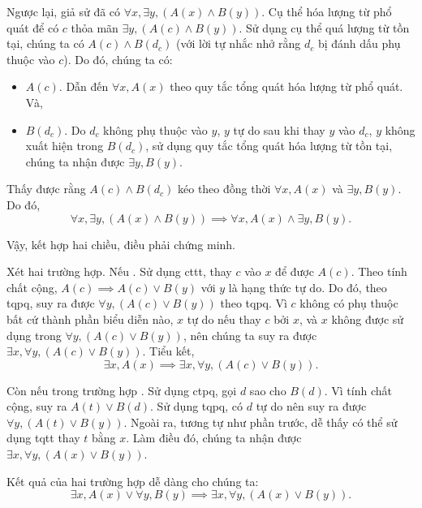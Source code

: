 Ngược lại, giả sử đã có $\forall x, \exists y, (A(x) \land B(y))$. Cụ thể hóa lượng từ phổ quát để có $c$ thỏa mãn $\exists y, (A(c) \land B(y))$. Sử dụng cụ thể quá lượng từ tồn tại, chúng ta có $A(c) \land B(d_c)$ (với lời tự nhắc nhở rằng $d_c$ bị đánh dấu phụ thuộc vào $c$). Do đó, chúng ta có:
\begin{itemize}
   \item $A(c)$. Dẫn đến $\forall x, A(x)$ theo quy tắc tổng quát hóa lượng từ phổ quát. Và,
   \item $B(d_c)$. Do $d_c$ không phụ thuộc vào $y$, $y$ tự do sau khi thay $y$ vào $d_c$, $y$ không xuất hiện trong $B(d_c)$, sử dụng quy tắc tổng quát hóa lượng từ tồn tại, chúng ta nhận được $\exists y, B(y)$.
\end{itemize}
Thấy được rằng $A(c) \land B(d_c)$ kéo theo đồng thời $\forall x, A(x)$ và $\exists y, B(y)$. Do đó, 
\begin{equation*}
   \forall x, \exists y, (A(x) \land B(y)) \implies \forall x, A(x) \land \exists y, B(y).
\end{equation*}

Vậy, kết hợp hai chiều, điều phải chứng minh.

\stepSubexercise Xét hai trường hợp. Nếu . Sử dụng cttt, thay $c$ vào $x$ để được $A(c)$. Theo tính chất cộng, $A(c) \implies A(c) \lor B(y)$ với $y$ là hạng thức tự do. Do đó, theo tqpq, suy ra được $\forall y, (A(c) \lor B(y))$ theo tqpq. Vì $c$ không có phụ thuộc bất cứ thành phần biểu diễn nào, $x$ tự do nếu thay $c$ bởi $x$, và $x$ không được sử dụng trong $\forall y, (A(c) \lor B(y))$, nên chúng ta suy ra được $\exists x, \forall y, (A(c) \lor B(y))$. Tiểu kết, 
\begin{equation*}
   \exists x, A(x) \implies \exists x, \forall y, (A(c) \lor B(y)).
\end{equation*}

Còn nếu trong trường hợp . Sử dụng ctpq, gọi $d$ sao cho $B(d)$. Vì tính chất cộng, suy ra $A(t) \lor B(d)$. Sử dụng tqpq, có $d$ tự do nên suy ra được $\forall y, (A(t) \lor B(y))$. Ngoài ra, tương tự như phần trước, dễ thấy có thể sử dụng tqtt thay $t$ bằng $x$. Làm điều đó, chúng ta nhận được $\exists x, \forall y, (A(x) \lor B(y))$.

Kết quả của hai trường hợp dễ dàng cho chúng ta:
\begin{equation*}
   \exists x, A(x) \lor \forall y, B(y) \implies \exists x, \forall y, (A(x) \lor B(y)).
\end{equation*}

